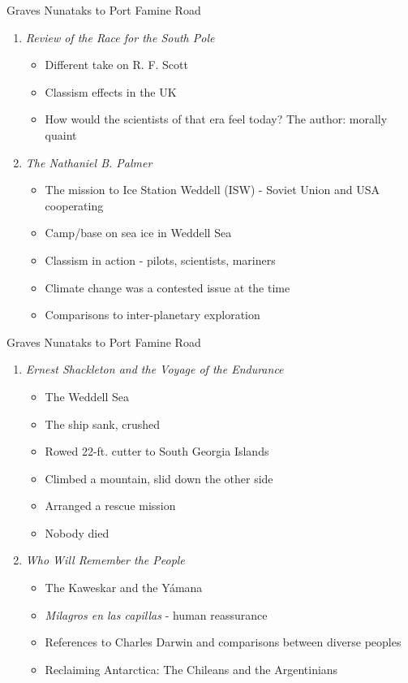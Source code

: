 \documentclass{beamer}
\begin{document}
\begin{frame}{Graves Nunataks to Port Famine Road}
\begin{enumerate}
\item \textit{Review of the Race for the South Pole}
\begin{itemize}
\item Different take on R. F. Scott
\item Classism effects in the UK
\item How would the scientists of that era feel today? The author: morally quaint
\end{itemize}
\item \textit{The Nathaniel B. Palmer}
\begin{itemize}
\item The mission to Ice Station Weddell (ISW) - Soviet Union and USA cooperating
\item Camp/base on sea ice in Weddell Sea
\item Classism in action - pilots, scientists, mariners
\item Climate change was a contested issue at the time
\item Comparisons to inter-planetary exploration
\end{itemize}
\end{enumerate}
\end{frame}

\begin{frame}{Graves Nunataks to Port Famine Road}
\begin{enumerate}
\item \textit{Ernest Shackleton and the Voyage of the Endurance}
\begin{itemize}
\item The Weddell Sea
\item The ship sank, crushed
\item Rowed 22-ft. cutter to South Georgia Islands
\item Climbed a mountain, slid down the other side
\item Arranged a rescue mission
\item Nobody died
\end{itemize}
\item \textit{Who Will Remember the People}
\begin{itemize}
\item The Kaweskar and the Y\'{a}mana
\item \textit{Milagros en las capillas} - human reassurance
\item References to Charles Darwin and comparisons between diverse peoples
\item Reclaiming Antarctica: The Chileans and the Argentinians
\end{itemize}
\end{enumerate}
\end{frame}
\end{document}
